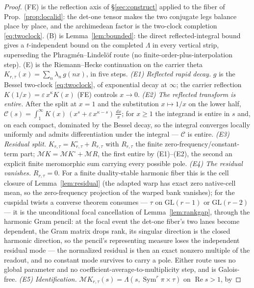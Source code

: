 \documentclass[11pt]{article}
\theoremstyle{definition}
\renewcommand{\Re}{\operatorname{Re}}
\newcommand{\Sym}{\operatorname{Sym}}
\begin{document}
\begin{proof}
\textup{(FE)} is the reflection axis of \S\ref{sec:construct} applied to the fiber of
Prop.~\ref{prop:localid}: the det-one tensor makes the two conjugate legs balance place by place, and the
archimedean factor is the two-clock completion \eqref{eq:twoclock}. \textup{(B)} is Lemma~\ref{lem:bounded}: the direct reflected-integral bound gives a $t$-independent bound on the completed $\Lambda$ in every vertical strip, superseding the Phragm\'en--Lindel\"of route (no finite-order-plus-interpolation step).
\textup{(E)} is the Riemann--Hecke continuation on the carrier theta $K_{r,\tau}(x)=\sum_n\lambda_n\,g(nx)$,
in five steps.
\emph{(E1) Reflected rapid decay.} $g$ is the Bessel two-clock \eqref{eq:twoclock}, of exponential decay at
$\infty$; the carrier reflection $K(1/x)=\varepsilon\,x^{\kappa}K(x)$ \textup{(FE)} controls $x\to0$.
\emph{(E2) The reflected transform is entire.} After the split at $x=1$ and the substitution $x\mapsto1/x$
on the lower half, $\mathcal C(s)=\int_1^\infty K(x)\,(x^{s}+\varepsilon\,x^{\kappa-s})\,\tfrac{dx}{x}$; for
$x\ge1$ the integrand is entire in $s$ and, on each compact, dominated by the Bessel decay, so the integral
converges locally uniformly and admits differentiation under the integral --- $\mathcal C$ is entire.
\emph{(E3) Residual split.} $K_{r,\tau}=K^\circ_{r,\tau}+R_{r,\tau}$ with $R_{r,\tau}$ the finite
zero-frequency/constant-term part; $\mathcal M K=\mathcal M K^\circ+\mathcal M R$, the first entire by
\textup{(E1)--(E2)}, the second an explicit finite meromorphic sum carrying every possible pole.
\emph{(E4) The residual vanishes.} $R_{r,\tau}=0$. For a finite duality-stable harmonic fiber this is the
cell closure of Lemma~\ref{lem:residual} (the adapted warp has exact zero native-cell mean, so the
zero-frequency projection of the warped bank vanishes); for the cuspidal twists a converse theorem consumes
--- $\tau$ on $\mathrm{GL}(r-1)$ or $\mathrm{GL}(r-2)$ --- it is the unconditional focal cancellation of
Lemma~\ref{lem:rankgap}, through the harmonic Gram pencil: at the focal event the det-one fiber's two lanes
become dependent, the Gram matrix drops rank, its singular direction is the closed harmonic direction, so the
pencil's representing measure loses the independent residual mode --- the normalized residual is then an exact
nonzero multiple of the readout, and no constant mode survives to carry a pole. Either route uses no global
parameter and no coefficient-average-to-multiplicity step, and is Galois-free.
\emph{(E5) Identification.} $\mathcal M K_{r,\tau}(s)=\Lambda(s,\Sym^r\pi\times\tau)$ on $\Re s>1$, by

\end{proof}
\end{document}
